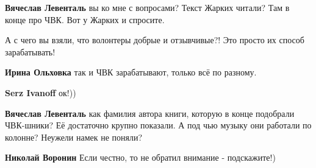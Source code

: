 \begin{itemize}
\begin{itemize}
\textbf{Вячеслав Левенталь} вы ко мне с вопросами? Текст Жарких читали? Там в конце про ЧВК. Вот у Жарких и спросите.

 
А с чего вы взяли, что волонтеры добрые и отзывчивые?! Это просто их способ зарабатывать!

 
\textbf{Ирина Ольховка} так и ЧВК зарабатывают, только всё по разному.

 
\textbf{Serz Ivanoff} ок!))

 
\textbf{Вячеслав Левенталь} как фамилия автора книги, которую в конце подобрали ЧВК-шники? Её достаточно крупно показали. А под чью музыку они работали по колонне? Неужели намек не поняли?\Laughey[1.0][white]

 
\textbf{Николай Воронин} Если честно, то не обратил внимание - подскажите!)

 

\end{itemize}
\end{itemize}
